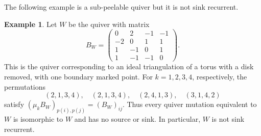 \documentclass[12pt, letter]{amsart}
\theoremstyle{definition}
\newtheorem{example}[theorem]{Example}
\numberwithin{equation}{section}
\begin{document}
The following example is a sub-peelable quiver but it is not sink recurrent.

\begin{example}\label{ex:strict}
Let $W$ be the quiver with matrix
\begin{equation}\label{eq:W}
 B_W=\begin{pmatrix}
 0&2&-1&-1\\-2&0&1&1\\1&-1&0&1\\1&-1&-1&0
 \end{pmatrix}.
\end{equation}
This is the quiver corresponding to an ideal triangulation of a torus with a disk removed, with one boundary marked point.
For $k=1,2,3,4$, respectively, the permutations
\[
 (2,1,3,4),\quad(2,1,3,4),\quad(2,4,1,3),\quad(3,1,4,2)
\]
satisfy $(\mu_k B_W)_{p(i),p(j)}=(B_W)_{ij}$.
Thus every quiver mutation equivalent to $W$ is isomorphic to
$W$ and has no source or sink. In particular, $W$ is not
sink recurrent.


\end{example}
\end{document}
